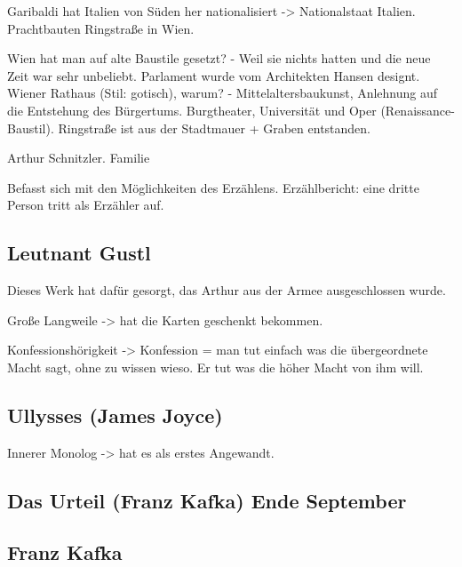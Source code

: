 \documentclass[12pt,a4paper]{article}
\begin{document}
Garibaldi hat Italien von Süden her nationalisiert -> Nationalstaat Italien.
Prachtbauten Ringstraße in Wien. 

Wien hat man auf alte Baustile gesetzt? - Weil sie nichts hatten und die neue Zeit war sehr unbeliebt. Parlament wurde vom Architekten Hansen designt. Wiener Rathaus (Stil: gotisch), warum? - Mittelaltersbaukunst, Anlehnung auf die Entstehung des Bürgertums. Burgtheater, Universität und Oper (Renaissance-Baustil). Ringstraße ist aus der Stadtmauer + Graben entstanden.

Arthur Schnitzler. Familie

Befasst sich mit den Möglichkeiten des Erzählens. Erzählbericht: eine dritte Person tritt als Erzähler auf.

\subsection{Leutnant Gustl}

Dieses Werk hat dafür gesorgt, das Arthur aus der Armee ausgeschlossen wurde.

Große Langweile -> hat die Karten geschenkt bekommen.

Konfessionshörigkeit -> Konfession = man tut einfach was die übergeordnete Macht sagt, ohne zu wissen wieso. Er tut was die höher Macht von ihm will.

\subsection{Ullysses (James Joyce)}

Innerer Monolog -> hat es als erstes Angewandt.

\subsection{Das Urteil (Franz Kafka) Ende September}

\subsection{Franz Kafka}
\end{document}
